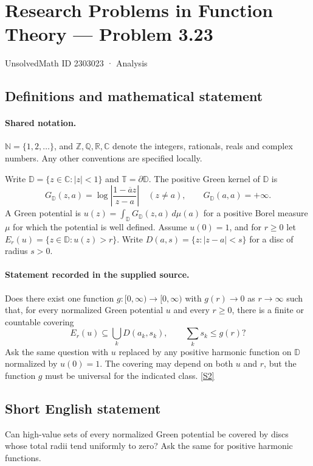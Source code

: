 \documentclass[11pt]{book}
\newcommand{\sref}[2]{\hyperlink{source:#1:#2}{[S#2]}}
\begin{document}
\setcounter{section}{2303022}
\section{Research Problems in Function Theory — Problem 3.23}\label{2303023}
{\small\sffamily UnsolvedMath ID 2303023 · Analysis}
\subsection{Definitions and mathematical statement}

\paragraph{Shared notation.}$\mathbb N=\{1,2,\ldots\}$, and $\mathbb Z,\mathbb Q,\mathbb R,\mathbb C$ denote the integers, rationals, reals and complex numbers. Any other conventions are specified locally.


Write $\mathbb D=\{z\in\mathbb C:|z|<1\}$ and $\mathbb T=\partial\mathbb D$. The positive Green kernel of $\mathbb D$ is
\[G_{\mathbb D}(z,a)=\log\left|\frac{1-\overline a z}{z-a}\right|\quad(z\ne a),\qquad G_{\mathbb D}(a,a)=+\infty.
\]
A Green potential is $u(z)=\int_{\mathbb D}G_{\mathbb D}(z,a)\,d\mu(a)$ for a positive Borel measure $\mu$ for which the potential is well defined. Assume $u(0)=1$, and for $r\ge0$ let $E_r(u)=\{z\in\mathbb D:u(z)>r\}$. Write $D(a,s)=\{z:|z-a|<s\}$ for a disc of radius $s>0$.
\paragraph{Statement recorded in the supplied source.}
Does there exist one function $g:[0,\infty)\to[0,\infty)$ with $g(r)\to0$ as $r\to\infty$ such that, for every normalized Green potential $u$ and every $r\ge0$, there is a finite or countable covering
\[E_r(u)\subseteq\bigcup_kD(a_k,s_k),\qquad\sum_ks_k\le g(r)?\]
Ask the same question with $u$ replaced by any positive harmonic function on $\mathbb D$ normalized by $u(0)=1$. The covering may depend on both $u$ and $r$, but the function $g$ must be universal for the indicated class. \sref{2303023}{2}
\subsection{Short English statement}
Can high-value sets of every normalized Green potential be covered by discs whose total radii tend uniformly to zero? Ask the same for positive harmonic functions.
\end{document}
